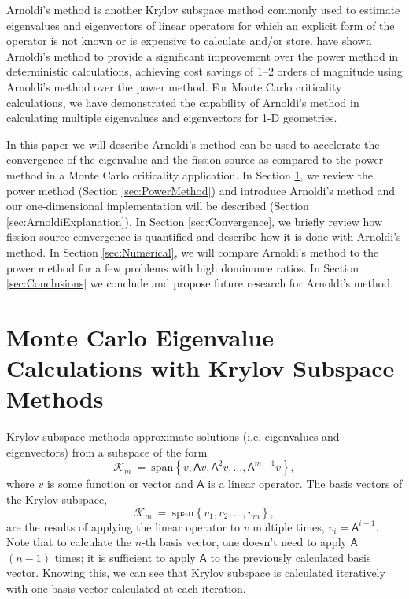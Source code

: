\documentclass[12]{ansnse}
\newcommand{\op}[1]{\ensuremath{\bm{\mathsf{#1}}}}
\begin{document}
\begin{doublespace}
Arnoldi's method\cite{Arnoldi:1951The-P-0} is another Krylov subspace method commonly used to estimate eigenvalues and eigenvectors of linear operators for which an explicit form of the operator is not known or is expensive to calculate and/or store.  \citet{Warsa:2004Krylo-0} have shown Arnoldi's method to provide a significant improvement over the power method in deterministic calculations, achieving cost savings of 1--2 orders of magnitude using Arnoldi's method over the power method.  For Monte Carlo criticality calculations, we have demonstrated\cite{Conlin:2008Arnol-0} the capability of Arnoldi's method in calculating multiple eigenvalues and eigenvectors for 1-D geometries.  

In this paper we will describe Arnoldi's method can be used to accelerate the convergence of the eigenvalue and the fission source as compared to the power method in a Monte Carlo criticality application.  In Section \ref{sec:KrylovMethods}, we review the power method (Section \ref{sec:PowerMethod}) and introduce Arnoldi's method and our one-dimensional implementation will be described (Section \ref{sec:ArnoldiExplanation}).  In Section \ref{sec:Convergence}, we briefly review how fission source convergence is quantified and describe how it is done with Arnoldi's method.  In Section \ref{sec:Numerical}, we will compare Arnoldi's method to the power method for a few problems with high dominance ratios.  In Section \ref{sec:Conclusions} we conclude and propose future research for Arnoldi's method.  %

\section{Monte Carlo Eigenvalue Calculations with Krylov Subspace Methods}\label{sec:KrylovMethods}
Krylov subspace methods\cite{Saad:1992Numer-0} approximate solutions (i.e. eigenvalues and eigenvectors) from a subspace of the form
\begin{equation}
    \mathcal{K}_m~=~\mathrm{span}\left\{v, \op{A} v, \op{A}^2v, \ldots , \op{A}^{m-1}v\right\},
    \label{eq:Krylov}
\end{equation}
where $v$ is some function or vector and $\op{A}$ is a linear operator.  The basis vectors of the Krylov subspace,
\begin{equation}
    \mathcal{K}_m~=~\mathrm{span}\left\{v_1, v_2, \ldots, v_{m}\right\},
    \label{eq:KrylovBasisVectors}
\end{equation}
are the results of applying the linear operator to $v$ multiple times, $v_i = \op{A}^{i-1}$.  Note that to calculate the $n$-th basis vector, one doesn't need to apply \op{A} \mbox{$(n-1)$} times; it is sufficient to apply \op{A} to the previously calculated basis vector.  Knowing this, we can see that Krylov subspace is calculated iteratively with one basis vector calculated at each iteration.


\end{doublespace}
\end{document}
